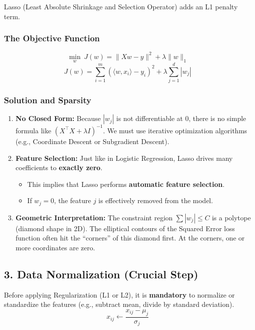 \documentclass[
  italian,
  11pt,
]{article}
\providecommand{\tightlist}{%
  \setlength{\itemsep}{0pt}\setlength{\parskip}{0pt}}
\begin{document}
Lasso (Least Absolute Shrinkage and Selection Operator) adds an L1
penalty term.

\subsubsection{The Objective Function}\label{the-objective-function-1}

\[ \min_{w} \ J(w) = \| Xw - y \|^2 + \lambda \| w \|_1 \]
\[ J(w) = \sum_{i=1}^{m} (\langle w, x_i \rangle - y_i)^2 + \lambda \sum_{j=1}^{d} |w_j| \]

\subsubsection{Solution and Sparsity}\label{solution-and-sparsity}

\begin{enumerate}
\def\labelenumi{\arabic{enumi}.}
\tightlist
\item
  \textbf{No Closed Form:} Because \(|w_j|\) is not differentiable at 0,
  there is no simple formula like \((X^\top X + \lambda I)^{-1}\). We
  must use iterative optimization algorithms (e.g., Coordinate Descent
  or Subgradient Descent).
\item
  \textbf{Feature Selection:} Just like in Logistic Regression, Lasso
  drives many coefficients to \textbf{exactly zero}.

  \begin{itemize}
  \tightlist
  \item
    This implies that Lasso performs \textbf{automatic feature
    selection}.
  \item
    If \(w_j = 0\), the feature \(j\) is effectively removed from the
    model.
  \end{itemize}
\item
  \textbf{Geometric Interpretation:} The constraint region
  \(\sum |w_j| \le C\) is a polytope (diamond shape in 2D). The
  elliptical contours of the Squared Error loss function often hit the
  ``corners'' of this diamond first. At the corners, one or more
  coordinates are zero.
\end{enumerate}

\subsection{3. Data Normalization (Crucial
Step)}\label{data-normalization-crucial-step}

Before applying Regularization (L1 or L2), it is \textbf{mandatory} to
normalize or standardize the features (e.g., subtract mean, divide by
standard deviation).
\[ x_{ij} \leftarrow \frac{x_{ij} - \mu_j}{\sigma_j} \]
\end{document}
